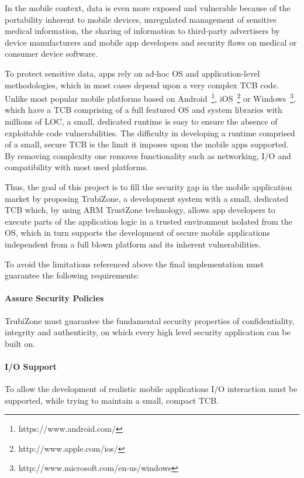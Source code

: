 In the mobile context, data is even more exposed and vulnerable because of the portability inherent to mobile devices, unregulated management of sensitive medical information, the sharing of information to third-party advertisers by device manufacturers and mobile app developers and security flaws on medical or consumer device software.

To protect sensitive data, \ac{apps} rely on ad-hoc \ac{OS} and application-level methodologies, which in most cases depend upon a very complex \ac{TCB} code. Unlike most popular mobile platforms based on Android~\footnote{https://www.android.com/}, iOS~\footnote{http://www.apple.com/ios/} or Windows~\footnote{http://www.microsoft.com/en-us/windows}, which have a \ac{TCB} comprising of a full featured \ac{OS} and system libraries with millions of \ac{LOC}, a small, dedicated runtime is easy to ensure the absence of exploitable code vulnerabilities. The difficulty in developing a runtime comprised of a small, secure \ac{TCB} is the limit it imposes upon the mobile \ac{apps} supported. By removing complexity one removes functionality such as networking, I/O and compatibility with most used platforms. 

Thus, the goal of this project is to fill the security gap in the mobile application market by proposing TrubiZone, a development system with a small, dedicated \ac{TCB} which, by using ARM TrustZone technology, allows app developers to execute parts of the application logic in a trusted environment isolated from the \ac{OS}, which in turn supports the development of secure mobile applications independent from a full blown platform and its inherent vulnerabilities.

To avoid the limitations referenced above the final implementation must guarantee the following requirements:

\paragraph*{\textbf{Assure Security Policies\\}}
TrubiZone must guarantee the fundamental security properties of confidentiality, integrity and authenticity, on which every high level security application can be built on.

\paragraph*{\textbf{I/O Support\\}}
To allow the development of realistic mobile applications I/O interaction must be supported, while trying to maintain a small, compact \ac{TCB}.

